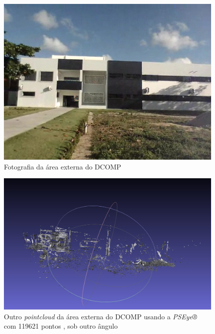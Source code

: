 \begin{figure}[H]
	\centering
		\includegraphics[width= \textwidth]{Imagens/figura4-7.jpg}
	\caption{Fotografia da área externa do DCOMP}
	\label{fig4:7}
\end{figure}

\begin{figure}[H]
	\centering
		\includegraphics[width= \textwidth]{Imagens/figura4-8.jpg}
	\caption{Outro \textit{pointcloud} da área externa do DCOMP usando a \textit{PSEye®} com 119621 pontos , sob outro ângulo}
	\label{fig4:8}
\end{figure}


